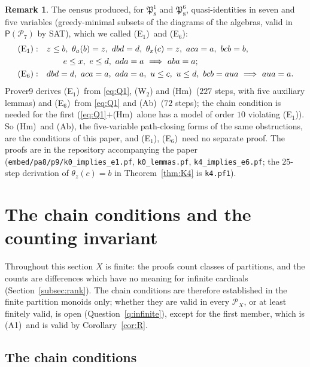 \documentclass[11pt]{amsart}
\theoremstyle{definition}
\newtheorem{remark}[theorem]{Remark}
\renewcommand{\P}{\mathcal{P}}      %
\newcommand{\PA}{\mathsf{P}}         %
\newcommand{\Rcond}{\textup{(A1)}}     %
\newcommand{\Eone}{\textup{(E$_1$)}}
\newcommand{\Esix}{\textup{(E$_6$)}}
\newcommand{\Kzero}{\textup{(Hm)}}     %
\newcommand{\Kfour}{\textup{(Ab)}}     %
\newcommand{\Wn}[1][n]{\textup{(W$_{#1}$)}}
\begin{document}
\begin{remark}\label{rem:E1E6}
The census produced, for $\mathfrak P_8^1$ and $\mathfrak P_8^6$, quasi-identities in seven and five variables (greedy-minimal subsets of the diagrams of the algebras, valid in $\PA(\P_7)$ by SAT), which we called \Eone\ and \Esix:
\begin{align*}
\Eone:\quad& z\le b,\ \theta_a(b)=z,\ dbd=d,\ \theta_x(c)=z,\ aca=a,\ bcb=b,\\
&\qquad e\le x,\ e\le d,\ ada=a\ \Longrightarrow\ aba=a;\\
\Esix:\quad& dbd=d,\ aca=a,\ ada=a,\ u\le c,\ u\le d,\ bcb=aua\ \Longrightarrow\ aua=a .
\end{align*}
Prover9 derives \Eone\ from \eqref{eq:Q1}, \Wn[2] and \Kzero\ ($227$ steps, with five auxiliary lemmas) and \Esix\ from \eqref{eq:Q1} and \Kfour\ ($72$ steps); the chain condition is needed for the first (\eqref{eq:Q1}$+$\Kzero\ alone has a model of order $10$ violating \Eone). So \Kzero\ and \Kfour, the five-variable path-closing forms of the same obstructions, are the conditions of this paper, and \Eone, \Esix\ need no separate proof. The proofs are in the repository accompanying the paper (\texttt{embed/pa8/p9/k0\_implies\_e1.pf}, \texttt{k0\_lemmas.pf}, \texttt{k4\_implies\_e6.pf}; the $25$-step derivation of $\theta_z(c)=b$ in Theorem~\ref{thm:K4} is \texttt{k4.pf1}).
\end{remark}

\section{The chain conditions and the counting invariant}\label{sec:chain}

Throughout this section $X$ is finite: the proofs count classes of partitions, and the counts are differences which have no meaning for infinite cardinals (Section~\ref{subsec:rank}). The chain conditions are therefore established in the finite partition monoids only; whether they are valid in every $\P_X$, or at least finitely valid, is open (Question~\ref{q:infinite}), except for the first member, which is \Rcond\ and is valid by Corollary~\ref{cor:R}.

\subsection{The chain conditions}\label{subsec:chaindef}
\end{document}
